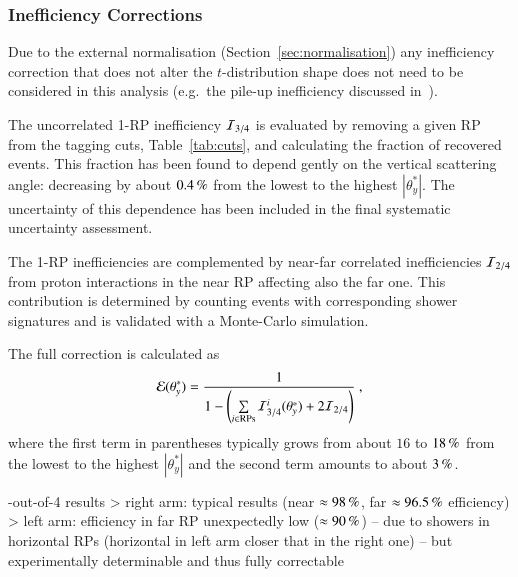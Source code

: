 \subsubsection{Inefficiency Corrections}
\label{sec:ineff corr}

Due to the external normalisation (Section~\ref{sec:normalisation}) any inefficiency correction that does not alter the $t$-distribution shape does not need to be considered in this analysis (e.g.~the pile-up inefficiency discussed in~\cite{prl111}).

The uncorrelated 1-RP inefficiency ${\cal I}_{3/4}$ is evaluated by removing a given RP from the tagging cuts, Table~\ref{tab:cuts}, and calculating the fraction of recovered events. This fraction has been found to depend gently on the vertical scattering angle: decreasing by about $0.4\,{\rm \%}$ from the lowest to the highest $|\theta_y^*|$. The uncertainty of this dependence has been included in the final systematic uncertainty assessment.

The 1-RP inefficiencies are complemented by near-far correlated inefficiencies ${\cal I}_{2/4}$ from proton interactions in the near RP affecting also the far one. This contribution is determined by counting events with corresponding shower signatures and is validated with a Monte-Carlo simulation.

The full correction is calculated as
\begin{equation}
\label{efficiency}
	{\cal E}(\theta_y^*) = {1\over 1 - \left( \sum\limits_{i\in \rm RPs} {\cal I}^i_{3/4}(\theta_y^*) + 2 {\cal I}_{2/4} \right) } \ ,
\end{equation}
where the first term in parentheses typically grows from about $16$ to $18\,{\rm \%}$ from the lowest to the highest $|\theta_y^*|$ and the second term amounts to about $3\,{\rm \%}$.

\iffalse
{}-out-of-4 results
\>> right arm: typical results (near $\approx 98\,{\rm \%}$, far $\approx 96.5\,{\rm \%}$ efficiency)
\>> left arm: efficiency in far RP unexpectedly low ($\approx 90\,{\rm \%}$) -- due to showers in horizontal RPs (horizontal in left arm closer that in the right one) -- but experimentally determinable and thus fully correctable

